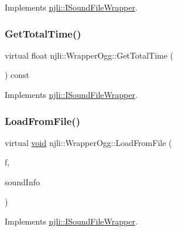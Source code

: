Implements \mbox{\hyperlink{classnjli_1_1_i_sound_file_wrapper_afefb180620c4a6e17e994a867726eb29}{njli\+::\+I\+Sound\+File\+Wrapper}}.

\mbox{\label{classnjli_1_1_wrapper_ogg_adb921d96c9d60b6539fbc05e08989ffa}} 
\subsubsection{\texorpdfstring{Get\+Total\+Time()}{GetTotalTime()}}
{\footnotesize\ttfamily virtual float njli\+::\+Wrapper\+Ogg\+::\+Get\+Total\+Time (\begin{DoxyParamCaption}{ }\end{DoxyParamCaption}) const\hspace{0.3cm}{\ttfamily [virtual]}}



Implements \mbox{\hyperlink{classnjli_1_1_i_sound_file_wrapper_a1b22318560969f7cc06ac03dcb78971f}{njli\+::\+I\+Sound\+File\+Wrapper}}.

\mbox{\label{classnjli_1_1_wrapper_ogg_a315af49a4e484e1cb8689a11dfe9db2f}} 
\subsubsection{\texorpdfstring{Load\+From\+File()}{LoadFromFile()}}
{\footnotesize\ttfamily virtual \mbox{\hyperlink{_thread_8h_af1e856da2e658414cb2456cb6f7ebc66}{void}} njli\+::\+Wrapper\+Ogg\+::\+Load\+From\+File (\begin{DoxyParamCaption}\item[{F\+I\+LE $\ast$}]{f,  }\item[{Sound\+Info $\ast$}]{sound\+Info }\end{DoxyParamCaption})\hspace{0.3cm}{\ttfamily [virtual]}}



Implements \mbox{\hyperlink{classnjli_1_1_i_sound_file_wrapper_a525f86e4bbe65d5b90ee3eda171b5492}{njli\+::\+I\+Sound\+File\+Wrapper}}.

